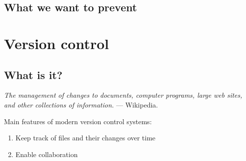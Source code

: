 \documentclass[slidestop]{beamer}
\begin{document}
\subsection{What we want to prevent}

\section{Version control}

\subsection{What is it?}
\begin{pframe}
  \emph{The management of changes to documents, computer programs, large web
  sites, and other collections of information.} --- Wikipedia.
  \bigskip
  \pause

  Main features of modern version control systems:
  \begin{enumerate}
    \item Keep track of files and their changes over time
    \item Enable collaboration
  \end{enumerate}
\end{pframe}
\end{document}
